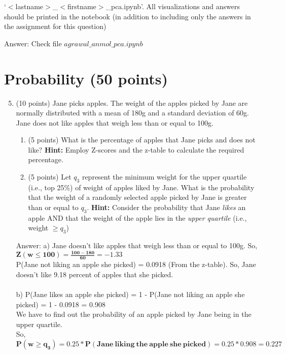 \documentclass{article}%
\begin{document}
\begin{enumerate}
\begin{enumerate}
        `$<$lastname$>$\_$<$firstname$>$\_pca.ipynb'. All visualizations and answers should be printed in the notebook (in addition to including only the answers in the assignment for this question)
    \end{enumerate}

    Answer: Check file $agrawal\_anmol\_pca.ipynb$
\end{enumerate}

\section*{Probability (50 points)}
\begin{enumerate}
    \setcounter{enumi}{4}
    \item (10 points) Jane picks apples. The weight of the apples picked by Jane are normally distributed with a mean of 180g and a standard deviation of 60g. Jane does not like apples that weigh less than or equal to 100g. 
    \begin{enumerate}
        \item (5 points) What is the percentage of apples that Jane picks and does not like? \textbf{Hint:} Employ Z-scores and the z-table to calculate the required percentage.
        \item (5 points) Let $q_3$ represent the minimum weight for the upper quartile (i.e., top 25\%) of weight of apples  liked by Jane. What is the probability that the weight of a randomly selected apple picked by Jane is greater than or equal to $q_3$. \textbf{Hint:} Consider the probability that Jane \emph{likes} an apple AND that the weight of the apple lies in the \emph{upper quartile} (i.e., weight $\geq q_3$)
    \end{enumerate}

    Answer: a) Jane doesn't like apples that weigh less than or equal to 100g. So, $\mathbf{ Z(w \le 100) = \frac{100 - 180}{60} = -1.33 }$ \\
    P(Jane not liking an apple she picked) = 0.0918 (From the z-table). So, Jane doesn't like 9.18 percent of apples that she picked. \\ \\
    b) P(Jane likes an apple she picked) = 1 - P(Jane not liking an apple she picked) = 1 - 0.0918 = 0.908 \\
    We have to find out the probability of an apple picked by Jane being in the upper quartile. \\
    So, $\mathbf{ P(w \ge q_3) = 0.25 * P(Jane \ liking \ the \ apple \ she \ picked) = 0.25 * 0.908 = 0.227 }$



\end{enumerate}
\end{document}
